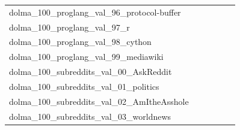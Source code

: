 \documentclass[dvipsnames]{article}
\begin{document}
\begin{appendix}
{\begin{longtable}{m{6cm}m{1.7cm}m{1.7cm}m{1.7cm}m{1.7cm}m{1.7cm}}
	dolma\_100\_proglang\_val\_96\_protocol-buffer  & \colorbox[HTML]{d9f0a3}{\makebox[\mywidth][c]{1.32}} & \colorbox[HTML]{7dc87b}{\makebox[\mywidth][c]{1.31}} & \colorbox[HTML]{ffffe5}{\makebox[\mywidth][c]{1.38}} & \colorbox[HTML]{77c578}{\makebox[\mywidth][c]{1.31}} & \colorbox[HTML]{a0d789}{\makebox[\mywidth][c]{1.32}}\\
	dolma\_100\_proglang\_val\_97\_r  & \colorbox[HTML]{77c578}{\makebox[\mywidth][c]{2.80}} & \colorbox[HTML]{def2a6}{\makebox[\mywidth][c]{2.92}} & \colorbox[HTML]{ffffe5}{\makebox[\mywidth][c]{3.66}} & \colorbox[HTML]{b8e293}{\makebox[\mywidth][c]{2.86}} & \colorbox[HTML]{89cd7f}{\makebox[\mywidth][c]{2.81}}\\
	dolma\_100\_proglang\_val\_98\_cython  & \colorbox[HTML]{77c578}{\makebox[\mywidth][c]{2.34}} & \colorbox[HTML]{def2a6}{\makebox[\mywidth][c]{2.39}} & \colorbox[HTML]{ffffe5}{\makebox[\mywidth][c]{2.69}} & \colorbox[HTML]{b6e092}{\makebox[\mywidth][c]{2.36}} & \colorbox[HTML]{8ccf81}{\makebox[\mywidth][c]{2.35}}\\
	dolma\_100\_proglang\_val\_99\_mediawiki  & \colorbox[HTML]{77c578}{\makebox[\mywidth][c]{2.01}} & \colorbox[HTML]{eaf7af}{\makebox[\mywidth][c]{2.10}} & \colorbox[HTML]{ffffe5}{\makebox[\mywidth][c]{2.48}} & \colorbox[HTML]{f6fbb8}{\makebox[\mywidth][c]{2.12}} & \colorbox[HTML]{b2df90}{\makebox[\mywidth][c]{2.04}}\\
	dolma\_100\_subreddits\_val\_00\_AskReddit  & \colorbox[HTML]{ffffe5}{\makebox[\mywidth][c]{20.25}} & \colorbox[HTML]{d5eea1}{\makebox[\mywidth][c]{19.29}} & \colorbox[HTML]{ffffe5}{\makebox[\mywidth][c]{20.38}} & \colorbox[HTML]{d4eea0}{\makebox[\mywidth][c]{19.28}} & \colorbox[HTML]{77c578}{\makebox[\mywidth][c]{19.14}}\\
	dolma\_100\_subreddits\_val\_01\_politics  & \colorbox[HTML]{ffffe5}{\makebox[\mywidth][c]{22.08}} & \colorbox[HTML]{addd8e}{\makebox[\mywidth][c]{20.70}} & \colorbox[HTML]{ffffe5}{\makebox[\mywidth][c]{22.07}} & \colorbox[HTML]{def2a6}{\makebox[\mywidth][c]{20.83}} & \colorbox[HTML]{77c578}{\makebox[\mywidth][c]{20.61}}\\
	dolma\_100\_subreddits\_val\_02\_AmItheAsshole  & \colorbox[HTML]{ffffe5}{\makebox[\mywidth][c]{22.49}} & \colorbox[HTML]{8bce80}{\makebox[\mywidth][c]{21.30}} & \colorbox[HTML]{ffffe5}{\makebox[\mywidth][c]{22.89}} & \colorbox[HTML]{eef8b2}{\makebox[\mywidth][c]{21.60}} & \colorbox[HTML]{77c578}{\makebox[\mywidth][c]{21.27}}\\
	dolma\_100\_subreddits\_val\_03\_worldnews  & \colorbox[HTML]{ffffe5}{\makebox[\mywidth][c]{22.57}} & \colorbox[HTML]{d8efa2}{\makebox[\mywidth][c]{21.43}} & \colorbox[HTML]{ffffe5}{\makebox[\mywidth][c]{22.77}} & \colorbox[HTML]{e7f5ad}{\makebox[\mywidth][c]{21.50}} & \colorbox[HTML]{77c578}{\makebox[\mywidth][c]{21.23}}\\

\end{longtable}}
\end{appendix}
\end{document}
